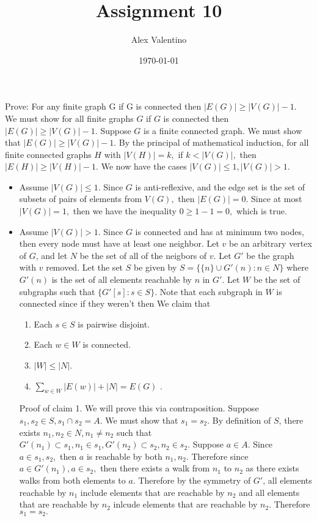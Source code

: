 \documentclass[12pt, letterpaper]{article}
\date{\today}
\author{Alex Valentino}
\title{Assignment 10}
\begin{document}
Prove: For any finite graph G if G is connected then $|E(G)|\geq|V (G)|-1$.\\
We must show for all finite graphs $G$ if $G$ is connected then $|E(G)|\geq|V (G)|-1$.  Suppose $G$ is a finite connected graph.  We must show that $|E(G)|\geq|V (G)|-1$.  By the principal of mathematical induction, for all finite connected graphs $H$ with $|V(H)| = k,$ if $k < |V(G)|,$ then $|E(H)| \geq |V(H)| - 1.$  We now have the cases $|V(G)| \leq 1, |V(G)| > 1.$
\begin{itemize}
	\item Assume $|V(G)| \leq 1$.  Since $G$ is anti-reflexive, and the edge set is the set of subsets of pairs of elements from $V(G),$ then $|E(G)| = 0.$  Since at most $|V(G)| = 1,$ then we have the inequality $0 \geq 1-1 = 0,$ which is true.
	\item Assume $|V(G)| > 1.$  Since $G$ is connected and has at minimum two nodes, then every node must have at least one neighbor.  Let $v$ be an arbitrary vertex of $G$, and let $N$ be the set of all of the neigbors of $v$.  Let $G'$ be the graph with $v$ removed.  Let the set $S$ be given by $S=\{\{n\} \cup G'(n): n \in N\}$ where $G'(n)$ is the set of all elements reachable by $n$ in $G'.$     	Let $W$ be the set of subgraphs such that $\{G'[s]: s \in S\}$.  Note that each subgraph in $W$ is connected since if they weren't then    We claim that \begin{enumerate}
	\item Each $s\in S$ is pairwise disjoint.
	\item Each $w \in W$ is connected.
	\item $|W| \leq |N|$.
	\item $\sum_{w\in W} |E(w)| + |N| = E(G)$	.
\end{enumerate}


Proof of claim 1.  We will prove this via contraposition.  Suppose $s_1, s_2 \in S, s_1 \cap s_2 = A$.  We must show that $s_1 = s_2.$ By definition of $S$, there exists $n_1, n_2 \in N, n_1 \neq n_2$ such that $G'(n_1) \subset s_1, n_1 \in s_1,G'(n_2) \subset s_2, n_2 \in s_2 .$ Suppose $a \in A.$ Since $a \in s_1, s_2,$ then $a$ is reachable by both $n_1,n_2.$  Therefore since $a \in G'(n_1), a \in s_2,$ then there exists a walk from $n_1$ to $n_2$ as there exists walks from both elements to $a$.  Therefore by the symmetry of $G'$, all elements reachable by $n_1$ include elements that are reachable by $n_2$ and all elements that are reachable by $n_2$ inlcude elements that are reachable by $n_2$.  Therefore $s_1 = s_2.$\\


\end{itemize}
\end{document}
